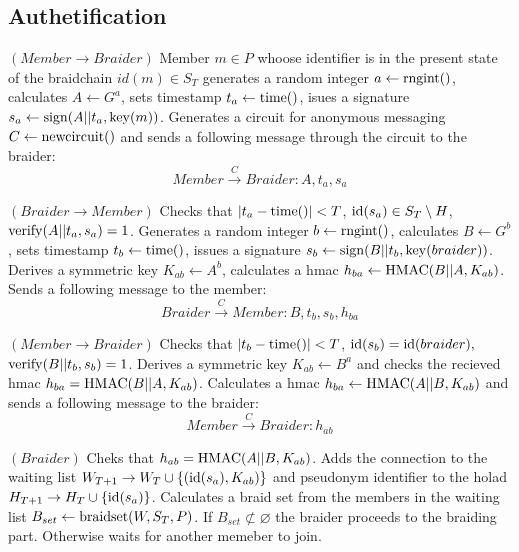\documentclass[12pt]{article}
\begin{document}
\subsection*{Authetification}


\begin{steps}
\item $(Member \to Braider)$ Member $m \in P$ whoose identifier is in the present state of the braidchain $id(m) \in S_T$ generates a random integer $a \leftarrow {\rm rngint}()$, calculates $A \leftarrow G^a$, sets timestamp $t_a \leftarrow {\rm time}()$, isues a signature $s_a \leftarrow {\rm sign}( A || t_a, {\rm key}(m))$. Generates a circuit for anonymous messaging $C \leftarrow {\rm newcircuit}()$ and sends a following message through the circuit to the braider:
  \begin{equation}
    Member \overset{C}{\to} Braider: A, t_a, s_a  
  \end{equation}

\item $(Braider \to Member)$ Checks that $|t_a - {\rm time}()| < T$, ${\rm id}(s_a) \in S_T \setminus H$, ${\rm verify}(A||t_a,s_a) = 1$. Generates a random integer $b \leftarrow {\rm rngint}()$, calculates $B \leftarrow G^b$, sets timestamp $t_b \leftarrow {\rm time}()$, issues a signature $s_b \leftarrow  {\rm sign}(B || t_b, {\rm key}(braider))$. Derives a symmetric key $K_{ab} \leftarrow A^b$, calculates a hmac $h_{ba} \leftarrow {\rm HMAC}(B||A,K_{ab})$. Sends a following message to the member:
  \begin{equation}
    Braider \overset{C}{\to} Member: B, t_b, s_b, h_{ba}
  \end{equation}

\item $(Member \to Braider)$ Checks that $|t_b - {\rm time}()| < T$, ${\rm id}(s_b)={\rm id}(braider),$ ${\rm verify}(B||t_b,s_b)=1$. Derives a symmetric key $K_{ab} \leftarrow B^a$ and checks the recieved hmac $h_{ba} = {\rm HMAC}(B||A,K_{ab})$. Calculates a hmac $h_{ba} \leftarrow {\rm HMAC}(A||B,K_{ab})$ and sends a following message to the braider:
  \begin{equation}
    Member \overset{C}{\to} Braider: h_{ab}
  \end{equation}

\item $(Braider)$ Cheks that $h_{ab} = {\rm HMAC}(A||B, K_{ab})$. Adds the connection to the waiting list $W_{T+1} \to W_T \cup \left\{ ({\rm id}(s_a), K_{ab}) \right\}$ and pseudonym identifier to the holad $H_{T+1} \to H_T \cup \{ {\rm id}(s_a)\}$. Calculates a braid set from the members in the waiting list $B_{set} \leftarrow {\rm braidset}(W, S_T, P)$. If $B_{set}\not\subset \varnothing$ the braider proceeds to the braiding part. Otherwise waits for another memeber to join.
\end{steps}
\end{document}

